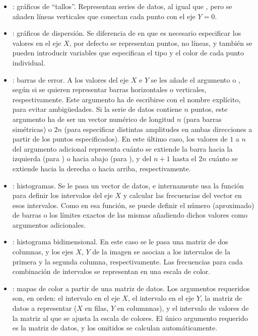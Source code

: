 \begin{itemize}
  \item {}: gráficos de ``tallos''. Representan series de datos, al igual que , pero se añaden líneas verticales que conectan cada punto con el eje $Y=0$.
  \item {}: gráficos de dispersión. Se diferencia de  en que es necesario especificar los valores en el eje $X$, por defecto se representan puntos, no líneas, y también se pueden introducir variables que especifican el tipo y el color de cada punto individual.
  \item {}: barras de error. A los valores del eje $X$ e $Y$ se les añade el argumento  o , según si se quieren representar barras horizontales o verticales, respectivamente. Este argumento ha de escribirse con el nombre explícito, para evitar ambigüedades. Si la serie de datos contiene $n$ puntos, este argumento ha de ser un vector numérico de longitud $n$ (para barras simétricas) o $2n$ (para especificar distintas amplitudes en ambas direcciones a partir de los puntos especificados). En este último caso, los valores de $1$ a $n$ del argumento adicional representa cuánto se extiende la barra hacia la izquierda (para ) o hacia abajo (para ), y del $n+1$ hasta el $2n$ cuánto se extiende hacia la derecha o hacia arriba, respectivamente.
  \item {}: histogramas. Se le pasa un vector de datos, e internamente usa la función  para definir los intervalos del eje $X$ y calcular las frecuencias del vector en esos intervalos. Como en esa función, se puede definir el número (aproximado) de barras o los límites exactos de las mismas añadiendo dichos valores como argumentos adicionales.
  \item{}: histograma bidimensional. En este caso se le pasa una matriz de dos columnas, y los ejes $X$, $Y$ de la imagen se asocian a los intervalos de la primera y la segunda columna, respectivamente. Las frecuencias para cada combinación de intervalos se representan en una escala de color.
  \item{}: mapas de color a partir de una matriz de datos. Los argumentos requeridos son, en orden: el intervalo en el eje $X$, el intervalo en el eje $Y$, la matriz de datos a representar ($X$ en filas, $Y$ en columnnas), y el intervalo de valores de la matriz al que se ajusta la escala de colores. El único argumento requerido es la matriz de datos, y los omitidos se calculan automáticamente.
\end{itemize}

